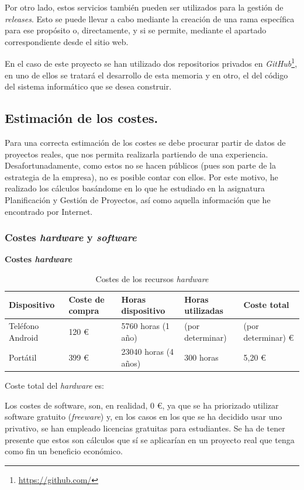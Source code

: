 \documentclass[twoside]{report}
\begin{document}
Por otro lado, estos servicios también pueden ser utilizados para la gestión de \textit{releases}. Esto se puede llevar a cabo mediante la creación de una rama específica para ese propósito o, directamente, y si se permite, mediante el apartado correspondiente desde el sitio web.

En el caso de este proyecto se han utilizado dos repositorios privados en \textit{GitHub}\footnote{\url{https://github.com/}}, en uno de ellos se tratará el desarrollo de esta memoria y en otro, el del código del sistema informático que se desea construir.

\subsection{Estimación de los costes.}

Para una correcta estimación de los costes se debe procurar partir de datos de proyectos reales, que nos permita realizarla partiendo de una experiencia. Desafortunadamente, como estos no se hacen públicos (pues son parte de la estrategia de la empresa), no es posible contar con ellos. Por este motivo, he realizado los cálculos basándome en lo que he estudiado en la asignatura \cite{pgptema2} Planificación y Gestión de Proyectos, así como aquella información que he encontrado por Internet.

\subsubsection{Costes \textit{hardware} y \textit{software}}
\textbf{Costes \textit{hardware}}
\begin{table}[H]
\center
\begin{tabular}{|l|l|l|l|l|}
\hline
Dispositivo        & Coste de compra   & Horas dispositivo & Horas utilizadas & Coste total \\ \hline
Teléfono Android   & 120 \euro      & 5760 horas (1 año)  & (por determinar)  & (por determinar) \euro \\ \hline
Portátil      & 399 \euro   &  23040 horas (4 años) & 300 horas  & 5,20 \euro \\ \hline
\end{tabular}
\caption{Costes de los recursos \textit{hardware}}
\end{table}

Coste total del \textit{hardware} es: 

Los costes de software, son, en realidad, 0 \euro, ya que se ha priorizado utilizar software gratuito (\textit{freeware}) y,  en los casos en los que se ha decidido usar uno privativo, se han empleado licencias gratuitas para estudiantes. Se ha de tener presente que estos son cálculos que sí se aplicarían en un proyecto real que tenga como fin un beneficio económico.
\end{document}
